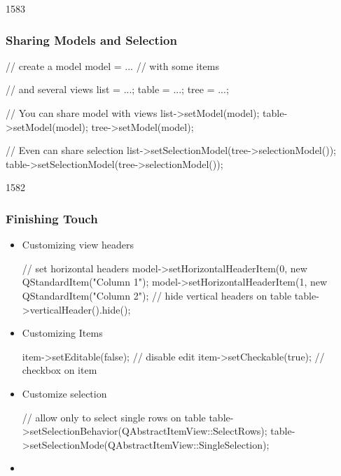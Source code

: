 \begin{slide}[fragile]{1583}\frametitle{Sharing Models and Selection}
  \begin{cpp}
// create a model
model = ... // with some items

// and several views
list = ...; table = ...; tree = ...;

// You can share model with views
list->setModel(model);      
table->setModel(model);      
tree->setModel(model);      

// Even can share selection
list->setSelectionModel(tree->selectionModel());
table->setSelectionModel(tree->selectionModel());
   \end{cpp}
\end{slide}


\begin{slide}[fragile]{1582}\frametitle{Finishing Touch}
  \begin{itemize}
  \item Customizing view headers
\begin{cpp}
// set horizontal headers
model->setHorizontalHeaderItem(0, new QStandardItem("Column 1");
model->setHorizontalHeaderItem(1, new QStandardItem("Column 2");
// hide vertical headers on table
table->verticalHeader().hide();
\end{cpp}
\item Customizing Items
\begin{cpp}
item->setEditable(false); // disable edit
item->setCheckable(true); // checkbox on item
\end{cpp}
\item Customize selection
\begin{cpp}
// allow only to select single rows on table
table->setSelectionBehavior(QAbstractItemView::SelectRows);
table->setSelectionMode(QAbstractItemView::SingleSelection);
\end{cpp}
\item[] 
\end{itemize}
\end{slide}


